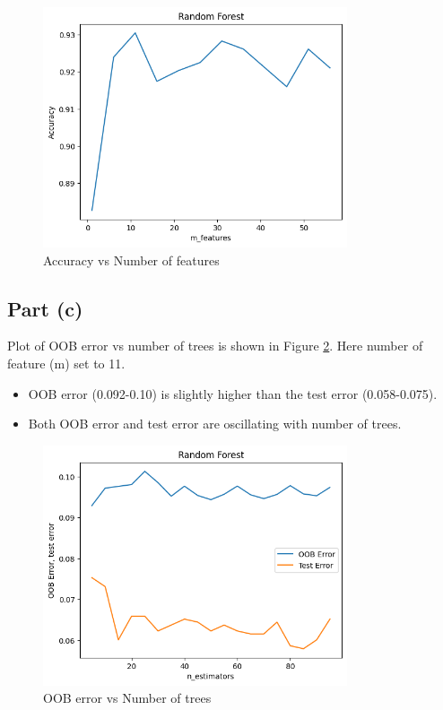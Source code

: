 \documentclass[12pt]{article}
\begin{document}
\begin{figure}[h]
    \centering
    \includegraphics[width=0.8\textwidth]{images/5_b.png}
    \caption{Accuracy vs Number of features}
    \label{fig:5_b}
\end{figure}

\subsection*{Part (c)}
Plot of OOB error vs number of trees is shown in Figure \ref{fig:5_c}. Here number of feature (m) set to 11.
\begin{itemize}
    \item OOB error (0.092-0.10) is slightly higher than the test error (0.058-0.075).
    \item Both OOB error and test error are oscillating with number of trees.
\end{itemize}

\begin{figure}[h]
    \centering
    \includegraphics[width=0.8\textwidth]{images/5_c.png}
    \caption{OOB error vs Number of trees}
    \label{fig:5_c}
\end{figure}
\end{document}
